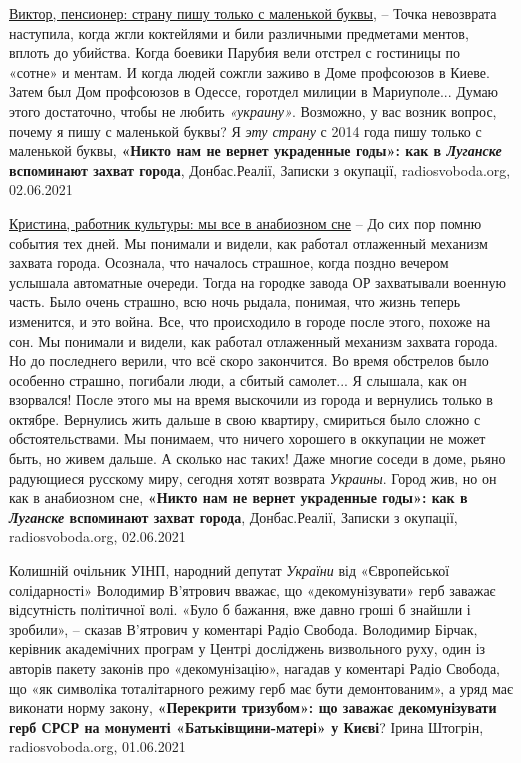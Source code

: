 \underline{Виктор, пенсионер: страну пишу только с маленькой буквы},
– Точка невозврата наступила, когда жгли коктейлями и били различными
предметами ментов, вплоть до убийства. Когда боевики Парубия вели отстрел с
гостиницы по «сотне» и ментам. И когда людей сожгли заживо в Доме профсоюзов в
Киеве. Затем был Дом профсоюзов в Одессе, горотдел милиции в Мариуполе... Думаю
этого достаточно, чтобы не любить \emph{«украину»}. Возможно, у вас возник вопрос,
почему я пишу с маленькой буквы? Я \emph{эту страну} с 2014 года пишу только с
маленькой буквы,
\textbf{«Никто нам не вернет украденные годы»: как в \emph{Луганске} вспоминают захват города},
Донбас.Реалії, Записки з окупації, radiosvoboda.org, 02.06.2021

\underline{Кристина, работник культуры: мы все в анабиозном сне} – До сих пор
помню события тех дней.  Мы понимали и видели, как работал отлаженный механизм
захвата города.  Осознала, что началось страшное, когда поздно вечером услышала
автоматные очереди. Тогда на городке завода ОР захватывали военную часть. Было
очень страшно, всю ночь рыдала, понимая, что жизнь теперь изменится, и это
война. Все, что происходило в городе после этого, похоже на сон. Мы понимали и
видели, как работал отлаженный механизм захвата города. Но до последнего
верили, что всё скоро закончится. Во время обстрелов было особенно страшно,
погибали люди, а сбитый самолет... Я слышала, как он взорвался! После этого мы
на время выскочили из города и вернулись только в октябре. Вернулись жить
дальше в свою квартиру, смириться было сложно с обстоятельствами. Мы понимаем,
что ничего хорошего в оккупации не может быть, но живем дальше. А сколько нас
таких! Даже многие соседи в доме, рьяно радующиеся русскому миру, сегодня хотят
возврата \emph{Украины}. Город жив, но он как в анабиозном сне,
\textbf{«Никто нам не вернет украденные годы»: как в \emph{Луганске} вспоминают захват города},
Донбас.Реалії, Записки з окупації, radiosvoboda.org, 02.06.2021

Колишній очільник УІНП, народний депутат \emph{України} від «Європейської
солідарності» Володимир В'ятрович вважає, що «декомунізувати» герб заважає
відсутність політичної волі. «Було б бажання, вже давно гроші б знайшли і
зробили», – сказав В'ятрович у коментарі Радіо Свобода. Володимир Бірчак,
керівник академічних програм у Центрі досліджень визвольного руху, один із
авторів пакету законів про «декомунізацію», нагадав у коментарі Радіо Свобода,
що «як символіка тоталітарного режиму герб має бути демонтованим», а уряд має
виконати норму закону,
\textbf{«Перекрити тризубом»: що заважає декомунізувати герб СРСР на монументі «Батьківщини-матері» у Києві}?
Ірина Штогрін, radiosvoboda.org, 01.06.2021

